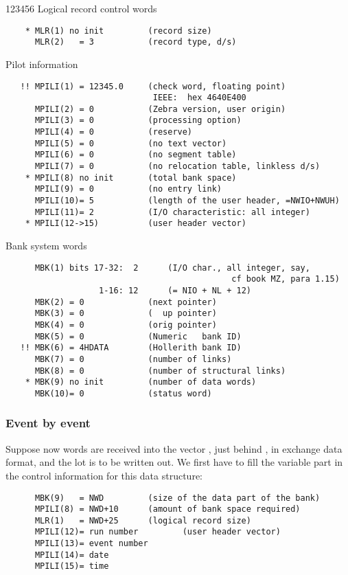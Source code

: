 \begin{DLtt}{123456}
Logical record control words

\begin{verbatim}
    * MLR(1) no init         (record size)
      MLR(2)   = 3           (record type, d/s)
\end{verbatim}

Pilot information

\begin{verbatim}
   !! MPILI(1) = 12345.0     (check word, floating point)
                              IEEE:  hex 4640E400
      MPILI(2) = 0           (Zebra version, user origin)
      MPILI(3) = 0           (processing option)
      MPILI(4) = 0           (reserve)
      MPILI(5) = 0           (no text vector)
      MPILI(6) = 0           (no segment table)
      MPILI(7) = 0           (no relocation table, linkless d/s)
    * MPILI(8) no init       (total bank space)
      MPILI(9) = 0           (no entry link)
      MPILI(10)= 5           (length of the user header, =NWIO+NWUH)
      MPILI(11)= 2           (I/O characteristic: all integer)
    * MPILI(12->15)          (user header vector)
\end{verbatim}

Bank system words

\begin{verbatim}
      MBK(1) bits 17-32:  2      (I/O char., all integer, say,
                                              cf book MZ, para 1.15)
                   1-16: 12      (= NIO + NL + 12)
      MBK(2) = 0             (next pointer)
      MBK(3) = 0             (  up pointer)
      MBK(4) = 0             (orig pointer)
      MBK(5) = 0             (Numeric   bank ID)
   !! MBK(6) = 4HDATA        (Hollerith bank ID)
      MBK(7) = 0             (number of links)
      MBK(8) = 0             (number of structural links)
    * MBK(9) no init         (number of data words)
      MBK(10)= 0             (status word)
\end{verbatim}

\subsubsection*{Event by event}

Suppose now  words are received into the vector ,
just behind , in exchange data format, and the lot is to be
written out. We first have to fill the variable part in the control
information for this data structure:

\begin{verbatim}
      MBK(9)   = NWD         (size of the data part of the bank)
      MPILI(8) = NWD+10      (amount of bank space required)
      MLR(1)   = NWD+25      (logical record size)
      MPILI(12)= run number         (user header vector)
      MPILI(13)= event number
      MPILI(14)= date
      MPILI(15)= time


\end{verbatim}
\end{DLtt}
